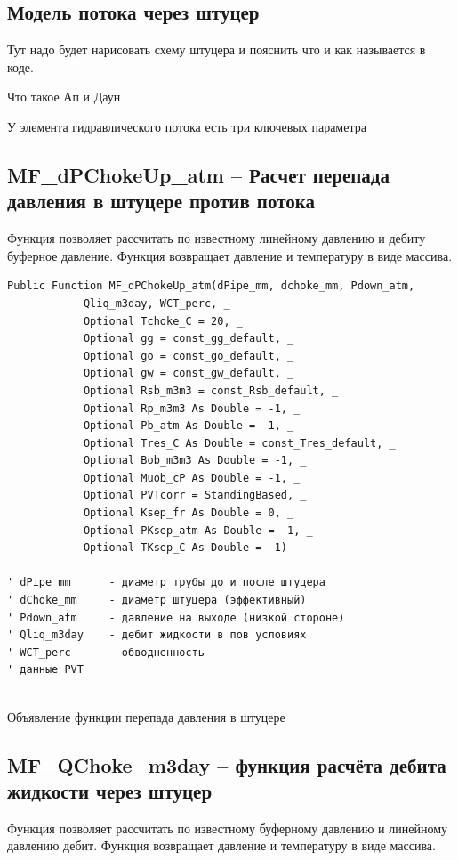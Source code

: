 \documentclass[]{scrreprt}
\begin{document}
\subsection{Модель потока через штуцер}

Тут надо будет нарисовать схему штуцера и пояснить что и как называется в коде. 

Что такое Ап и Даун

У элемента гидравлического потока есть три ключевых параметра 


\subsection{MF\_dPChokeUp\_atm – Расчет перепада давления в штуцере против потока}
Функция позволяет рассчитать по известному линейному давлению и дебиту буферное давление. 
Функция возвращает давление и температуру в виде массива.
\begin{listing}[H]
	\begin{verbatim}
Public Function MF_dPChokeUp_atm(dPipe_mm, dchoke_mm, Pdown_atm,
		    Qliq_m3day, WCT_perc, _
			Optional Tchoke_C = 20, _
			Optional gg = const_gg_default, _
			Optional go = const_go_default, _
			Optional gw = const_gw_default, _
			Optional Rsb_m3m3 = const_Rsb_default, _
			Optional Rp_m3m3 As Double = -1, _
			Optional Pb_atm As Double = -1, _
			Optional Tres_C As Double = const_Tres_default, _
			Optional Bob_m3m3 As Double = -1, _
			Optional Muob_cP As Double = -1, _
			Optional PVTcorr = StandingBased, _
			Optional Ksep_fr As Double = 0, _
			Optional PKsep_atm As Double = -1, _
			Optional TKsep_C As Double = -1)

' dPipe_mm      - диаметр трубы до и после штуцера
' dChoke_mm     - диаметр штуцера (эффективный)
' Pdown_atm     - давление на выходе (низкой стороне)
' Qliq_m3day    - дебит жидкости в пов условиях
' WCT_perc      - обводненность
' данные PVT
	
	\end{verbatim}
	\caption{Объявление функции перепада давления в штуцере}
	\label{lst:codedPChokeUp}
\end{listing}



\newpage
\subsection{MF\_QChoke\_m3day – функция расчёта дебита жидкости через штуцер}
Функция позволяет рассчитать по известному буферному давлению и линейному давлению дебит.
Функция возвращает давление и температуру в виде массива.
\end{document}
